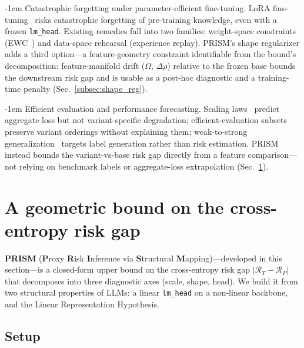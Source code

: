 \documentclass{article} %
\makeatletter
\newlength{\paraSpace}
\renewcommand{\paragraph}{\@startsection{paragraph}{4}{\z@}%
  {\paraSpace}{-1em}%
  {\normalfont\normalsize\bfseries}}
\makeatother
\begin{document}
\paragraph{Catastrophic forgetting under parameter-efficient fine-tuning.}
LoRA fine-tuning~\citep{hu2022lora} risks catastrophic forgetting of pre-training knowledge, even with a frozen \texttt{lm\_head}. Existing remedies fall into two families: weight-space constraints (EWC~\citep{kirkpatrick2017overcoming}) and data-space rehearsal (experience replay). PRISM's shape regularizer adds a third option---a feature-geometry constraint identifiable from the bound's decomposition: feature-manifold drift ($\Omega$, $\Delta\rho$) relative to the frozen base bounds the downstream risk gap and is usable as a post-hoc diagnostic and a training-time penalty (Sec.~\ref{subsec:shape_reg}).

\paragraph{Efficient evaluation and performance forecasting.}
Scaling laws~\citep{kaplan2020scaling, hoffmann2022training} predict aggregate loss but not variant-specific degradation; efficient-evaluation subsets~\citep{polo2024tinybenchmarks, perlitz2024efficient} preserve variant orderings without explaining them; weak-to-strong generalization~\citep{burns2023weak} targets label generation rather than risk estimation. PRISM instead bounds the variant-vs-base risk gap directly from a feature comparison---not relying on benchmark labels or aggregate-loss extrapolation (Sec.~\ref{sec:geometric_foundation}).



\section{A geometric bound on the cross-entropy risk gap}
\label{sec:geometric_foundation}

\textbf{PRISM} (\textbf{P}roxy \textbf{R}isk \textbf{I}nference via \textbf{S}tructural \textbf{M}apping)---developed in this section---is a closed-form upper bound on the cross-entropy risk gap $|\mathcal{R}_T - \mathcal{R}_P|$ that decomposes into three diagnostic axes (scale, shape, head). We build it from two structural properties of LLMs: a linear \texttt{lm\_head} on a non-linear backbone, and the Linear Representation Hypothesis.

\subsection{Setup}
\label{subsec:problem_setup}
\end{document}
